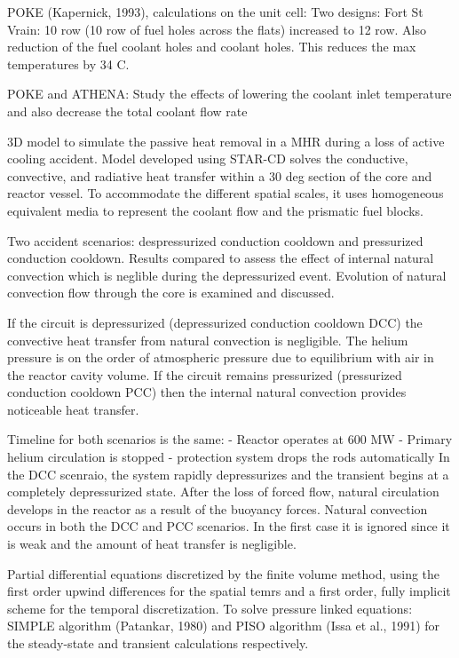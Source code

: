 POKE (Kapernick, 1993), calculations on the unit cell:
Two designs: Fort St Vrain: 10 row (10 row of fuel holes across the flats)
increased to 12 row. Also reduction of the fuel coolant holes and coolant holes.
This reduces the max temperatures by 34 C.

POKE and ATHENA:
Study the effects of lowering the coolant inlet temperature and also decrease the total coolant flow rate

3D model to simulate the passive heat removal in a MHR during a loss of active cooling accident.
Model developed using STAR-CD solves the conductive, convective, and radiative heat transfer within a 30 deg section of the core and reactor vessel.
To accommodate the different spatial scales, it uses homogeneous equivalent media to represent the coolant flow and the prismatic fuel blocks.

Two accident scenarios: despressurized conduction cooldown and pressurized conduction cooldown.
Results compared to assess the effect of internal natural convection which is neglible during the depressurized event.
Evolution of natural convection flow through the core is examined and discussed.

If the circuit is depressurized (depressurized conduction cooldown DCC) the convective heat transfer from natural convection is negligible.
The helium pressure is on the order of atmospheric pressure due to equilibrium with air in the reactor cavity volume.
If the circuit remains pressurized (pressurized conduction cooldown PCC) then the internal natural convection provides noticeable heat transfer.

Timeline for both scenarios is the same:
- Reactor operates at 600 MW
- Primary helium circulation is stopped
- protection system drops the rods automatically
In the DCC scenraio, the system rapidly depressurizes and the transient begins at a completely depressurized state.
After the loss of forced flow, natural circulation develops in the reactor as a result of the buoyancy forces.
Natural convection occurs in both the DCC and PCC scenarios. In the first case it is ignored since it is weak and the amount of heat transfer is negligible.

Partial differential equations discretized by the finite volume method, using the first order upwind differences for the spatial temrs and a first order, fully implicit scheme for the temporal discretization.
To solve pressure linked equations: SIMPLE algorithm (Patankar, 1980) and PISO algorithm (Issa et al., 1991) for the steady-state and transient calculations respectively.

